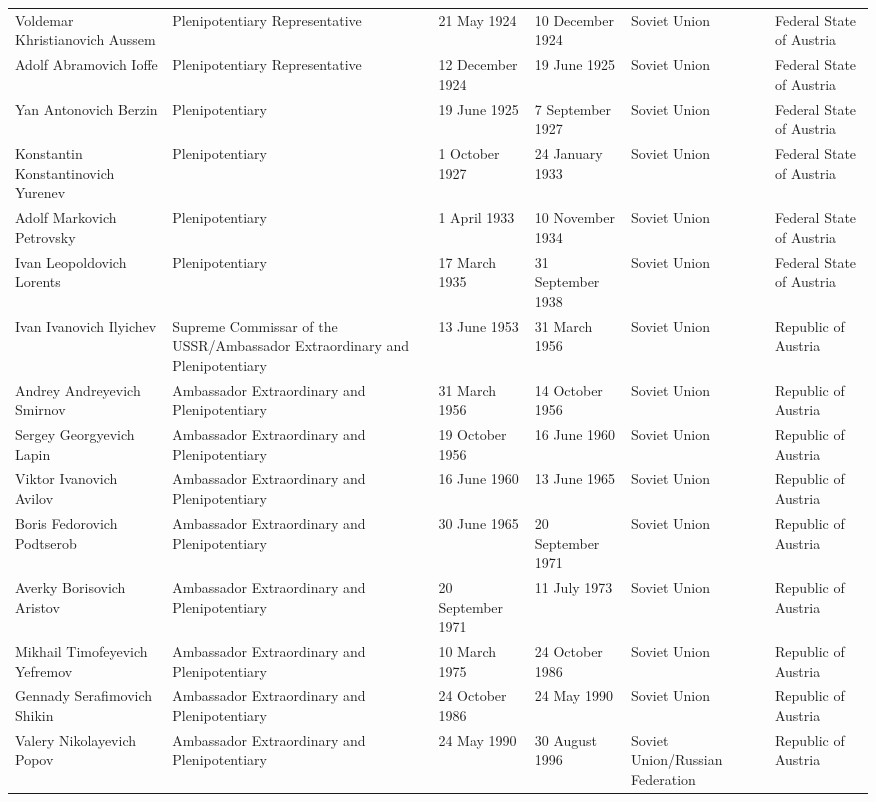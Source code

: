 \documentclass{article}
\begin{document}
\begin{tabular}{llllll}
Voldemar Khristianovich Aussem & Plenipotentiary Representative & 21 May 1924 & 10 December 1924 & Soviet Union & Federal State of Austria \\
Adolf Abramovich Ioffe & Plenipotentiary Representative & 12 December 1924 & 19 June 1925 & Soviet Union & Federal State of Austria \\
Yan Antonovich Berzin & Plenipotentiary & 19 June 1925 & 7 September 1927 & Soviet Union & Federal State of Austria \\
Konstantin Konstantinovich Yurenev & Plenipotentiary & 1 October 1927 & 24 January 1933 & Soviet Union & Federal State of Austria \\
Adolf Markovich Petrovsky & Plenipotentiary & 1 April 1933 & 10 November 1934 & Soviet Union & Federal State of Austria \\
Ivan Leopoldovich Lorents & Plenipotentiary & 17 March 1935 & 31 September 1938 & Soviet Union & Federal State of Austria \\
Ivan Ivanovich Ilyichev & Supreme Commissar of the USSR/Ambassador Extraordinary and Plenipotentiary & 13 June 1953 & 31 March 1956 & Soviet Union & Republic of Austria \\
Andrey Andreyevich Smirnov & Ambassador Extraordinary and Plenipotentiary & 31 March 1956 & 14 October 1956 & Soviet Union & Republic of Austria \\
Sergey Georgyevich Lapin & Ambassador Extraordinary and Plenipotentiary & 19 October 1956 & 16 June 1960 & Soviet Union & Republic of Austria \\
Viktor Ivanovich Avilov & Ambassador Extraordinary and Plenipotentiary & 16 June 1960 & 13 June 1965 & Soviet Union & Republic of Austria \\
Boris Fedorovich Podtserob & Ambassador Extraordinary and Plenipotentiary & 30 June 1965 & 20 September 1971 & Soviet Union & Republic of Austria \\
Averky Borisovich Aristov & Ambassador Extraordinary and Plenipotentiary & 20 September 1971 & 11 July 1973 & Soviet Union & Republic of Austria \\
Mikhail Timofeyevich Yefremov & Ambassador Extraordinary and Plenipotentiary & 10 March 1975 & 24 October 1986 & Soviet Union & Republic of Austria \\
Gennady Serafimovich Shikin & Ambassador Extraordinary and Plenipotentiary & 24 October 1986 & 24 May 1990 & Soviet Union & Republic of Austria \\
Valery Nikolayevich Popov & Ambassador Extraordinary and Plenipotentiary & 24 May 1990 & 30 August 1996 & Soviet Union/Russian Federation & Republic of Austria \\

\end{tabular}
\end{document}
